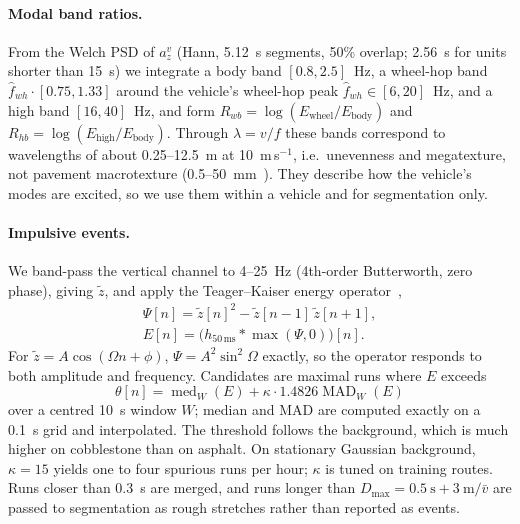 \paragraph{Modal band ratios.}
From the Welch PSD of $a^v_z$ (Hann, 5.12~s segments, 50\% overlap; 2.56~s for units shorter than 15~s) we integrate a body band $[0.8,2.5]$~Hz, a wheel-hop band $\hat f_{wh}\cdot[0.75,1.33]$ around the vehicle's wheel-hop peak $\hat f_{wh}\in[6,20]$~Hz, and a high band $[16,40]$~Hz, and form $R_{wb}=\log(E_{\mathrm{wheel}}/E_{\mathrm{body}})$ and $R_{hb}=\log(E_{\mathrm{high}}/E_{\mathrm{body}})$.
Through $\lambda=v/f$ these bands correspond to wavelengths of about 0.25--12.5~m at 10~m\,s$^{-1}$, i.e.\ unevenness and megatexture, not pavement macrotexture (0.5--50~mm~\cite{iso13473}).
They describe how the vehicle's modes are excited, so we use them within a vehicle and for segmentation only.

\paragraph{Impulsive events.}
We band-pass the vertical channel to 4--25~Hz (4th-order Butterworth, zero phase), giving $\tilde z$, and apply the Teager--Kaiser energy operator~\cite{kaiser1990tkeo},
\begin{gather}
\Psi[n]=\tilde z[n]^2-\tilde z[n-1]\,\tilde z[n+1],\\
E[n]=\bigl(h_{50\,\mathrm{ms}}*\max(\Psi,0)\bigr)[n].
\end{gather}
For $\tilde z=A\cos(\Omega n+\phi)$, $\Psi=A^2\sin^2\Omega$ exactly, so the operator responds to both amplitude and frequency.
Candidates are maximal runs where $E$ exceeds
\begin{equation}
\theta[n]=\operatorname{med}_W(E)+\kappa\cdot1.4826\operatorname{MAD}_W(E)
\end{equation}
over a centred 10~s window $W$; median and MAD are computed exactly on a 0.1~s grid and interpolated.
The threshold follows the background, which is much higher on cobblestone than on asphalt.
On stationary Gaussian background, $\kappa=15$ yields one to four spurious runs per hour; $\kappa$ is tuned on training routes.
Runs closer than 0.3~s are merged, and runs longer than $D_{\max}=0.5~\mathrm s+3~\mathrm m/\bar v$ are passed to segmentation as rough stretches rather than reported as events.

